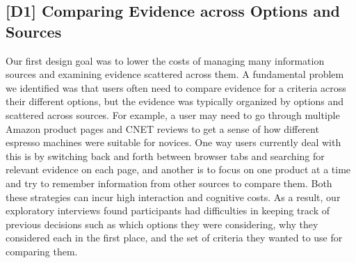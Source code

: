 
\subsection{[D1] Comparing Evidence across Options and Sources}

Our first design goal was to lower the costs of managing many information sources and examining evidence scattered across them. A fundamental problem we identified was that users often need to compare evidence for a criteria across their different options, but the evidence was typically organized by options and scattered across sources. For example, a user may need to go through multiple Amazon product pages and CNET reviews to get a sense of how different espresso machines were suitable for novices. One way users currently deal with this is by switching back and forth between browser tabs and searching for relevant evidence on each page, and another is to focus on one product at a time and try to remember information from other sources to compare them. Both these strategies can incur high interaction and cognitive costs. As a result, our exploratory interviews found participants had difficulties in keeping track of previous decisions such as which options they were considering, why they considered each in the first place, and the set of criteria they wanted to use for comparing them.

